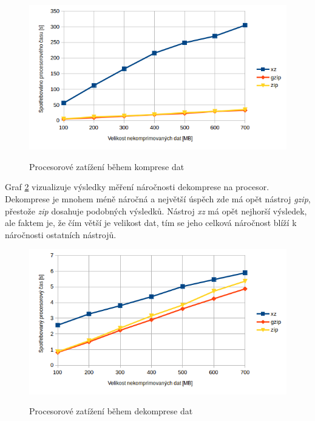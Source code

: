 \begin{figure}[H]
    \begin{center}
        \label{graph:komprese}
        \includegraphics[width=1.0\textwidth]{obrazky-figures/graph_komprese.png}
        \caption{Procesorové zatížení během komprese dat}
    \end{center}
\end{figure}

Graf \ref{graph:dekomprese} vizualizuje výsledky měření náročnosti dekomprese na
procesor. Dekomprese je mnohem méně náročná a největší úspěch zde má opět nástroj
\textit{gzip}, přestože \textit{zip} dosahuje podobných výsledků. Nástroj \textit{xz}
má opět nejhorší výsledek, ale faktem je, že čím větší je velikost dat, tím
se jeho celková náročnost blíží k náročnosti ostatních nástrojů.

\begin{figure}[H]
    \begin{center}
        \label{graph:dekomprese}
        \includegraphics[width=1.0\textwidth]{obrazky-figures/graph_dekomprese.png}
        \caption{Procesorové zatížení během dekomprese dat}
    \end{center}
\end{figure}

